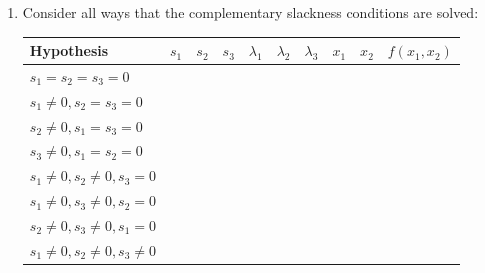 \documentclass[
]{book}
\providecommand{\tightlist}{%
  \setlength{\itemsep}{0pt}\setlength{\parskip}{0pt}}
\theoremstyle{definition}
\theoremstyle{definition}
\theoremstyle{definition}
\theoremstyle{remark}
\begin{document}

\begin{enumerate}
\def\labelenumi{\arabic{enumi}.}
\setcounter{enumi}{3}
\tightlist
\item
  Consider all ways that the complementary slackness conditions are solved:

  \begin{center}
  \begin{tabular}{|l|cccccccc|c|}
  \hline
  Hypothesis & $s_1$ & $s_2$ & $s_3$ & $\lambda_1$ & $\lambda_2$ & $\lambda_3$ & $x_1$ & $x_2$ & $f(x_1, x_2)$\\
  \hline
  $s_1 = s_2 = s_3 = 0$ & \multicolumn{8}{l|}{\phantom{No solution}} & \\
  $s_1 \neq 0, s_2 = s_3 = 0$ & \phantom{2} & \phantom{0} & \phantom{0} & \phantom{0} & \phantom{0} & \phantom{0} & \phantom{0} & \phantom{0} & \phantom{0}\\
  $s_2 \neq 0, s_1 = s_3 = 0$ & \phantom{0} & \phantom{2} & \phantom{0} & \phantom{-8} & \phantom{0} & \phantom{-8} & \phantom{4} & \phantom{0} & \phantom{-16}\\
  $s_3 \neq 0, s_1 = s_2 = 0$ & \phantom{0} & \phantom{0} & \phantom{2} & \phantom{-16} & \phantom{-16} & \phantom{0} & \phantom{0} & \phantom{4} & \phantom{-32}\\
  $s_1 \neq 0, s_2 \neq 0, s_3 = 0$ &\multicolumn{8}{l|}{\phantom{No solution}} & \\
  $s_1 \neq 0, s_3 \neq 0, s_2 = 0$ &\multicolumn{8}{l|}{\phantom{No solution}} & \\
  $s_2 \neq 0, s_3 \neq 0, s_1 = 0$ &\phantom{0} & \phantom{$\sqrt{\frac{8}{3}}$} & \phantom{$\sqrt{\frac{4}{3}}$} & \phantom{$-\frac{16}{3}$} & \phantom{0} & \phantom{0} & \phantom{$\frac{8}{3}$}& \phantom{$\frac{4}{3}$} & \phantom{$-\frac{32}{3}$}\\
  $s_1 \neq 0, s_2 \neq 0, s_3 \neq 0$ &\multicolumn{8}{l|}{\phantom{No solution}}& \\
  \hline
  \end{tabular}
  \end{center}
\end{enumerate}
\end{document}
